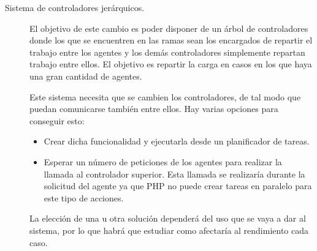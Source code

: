 \begin{description}
	\item[Sistema de controladores jerárquicos.]

		El objetivo de este cambio es poder disponer de un árbol de controladores donde los que se encuentren en las ramas sean los encargados de repartir el trabajo entre los agentes y los demás controladores simplemente repartan trabajo entre ellos. El objetivo es repartir la carga en casos en los que haya una gran cantidad de agentes.

		Este sistema necesita que se cambien los controladores, de tal modo que puedan comunicarse también entre ellos. Hay varias opciones para conseguir esto:

		\begin{itemize}
			\item Crear dicha funcionalidad y ejecutarla desde un planificador de tareas.

			\item Esperar un número de peticiones de los agentes para realizar la llamada al controlador superior. Esta llamada se realizaría durante la solicitud del agente ya que PHP no puede crear tareas en paralelo para este tipo de acciones.
		\end{itemize}

		La elección de una u otra solución dependerá del uso que se vaya a dar al sistema, por lo que habrá que estudiar como afectaría al rendimiento cada caso.
\end{description}